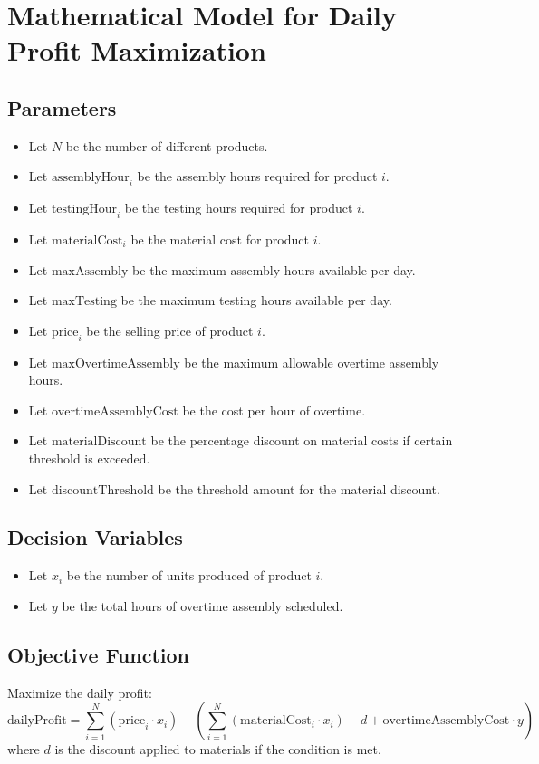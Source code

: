 \documentclass{article}
\begin{document}
\section*{Mathematical Model for Daily Profit Maximization}

\subsection*{Parameters}
\begin{itemize}
    \item Let \( N \) be the number of different products.
    \item Let \( \text{assemblyHour}_i \) be the assembly hours required for product \( i \).
    \item Let \( \text{testingHour}_i \) be the testing hours required for product \( i \).
    \item Let \( \text{materialCost}_i \) be the material cost for product \( i \).
    \item Let \( \text{maxAssembly} \) be the maximum assembly hours available per day.
    \item Let \( \text{maxTesting} \) be the maximum testing hours available per day.
    \item Let \( \text{price}_i \) be the selling price of product \( i \).
    \item Let \( \text{maxOvertimeAssembly} \) be the maximum allowable overtime assembly hours.
    \item Let \( \text{overtimeAssemblyCost} \) be the cost per hour of overtime.
    \item Let \( \text{materialDiscount} \) be the percentage discount on material costs if certain threshold is exceeded.
    \item Let \( \text{discountThreshold} \) be the threshold amount for the material discount.
\end{itemize}

\subsection*{Decision Variables}
\begin{itemize}
    \item Let \( x_i \) be the number of units produced of product \( i \).
    \item Let \( y \) be the total hours of overtime assembly scheduled.
\end{itemize}

\subsection*{Objective Function}
Maximize the daily profit:
\[
\text{dailyProfit} = \sum_{i=1}^{N} ( \text{price}_i \cdot x_i ) - \left( \sum_{i=1}^{N} ( \text{materialCost}_i \cdot x_i ) - d + \text{overtimeAssemblyCost} \cdot y \right)
\]
where \( d \) is the discount applied to materials if the condition is met.
\end{document}

